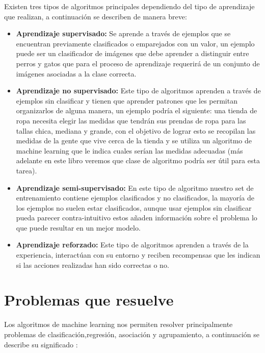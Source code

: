 \documentclass[11pt,fleqn]{book} %
\begin{document}
Existen tres tipos de algoritmos principales dependiendo del tipo de aprendizaje que realizan, a continuación se describen de manera breve:
\begin{itemize}
\item \textbf{Aprendizaje supervisado:} Se aprende a través de ejemplos que se encuentran previamente clasificados o emparejados con un valor, un ejemplo puede ser un clasificador de imágenes que debe aprender a distinguir entre perros y gatos que para el proceso de aprendizaje requerirá de un conjunto de imágenes asociadas a la clase correcta.
\item \textbf{Aprendizaje no supervisado:} Este tipo de algoritmos aprenden a través de ejemplos sin clasificar y tienen que aprender patrones que les permitan organizarlos de alguna manera, un ejemplo podría el siguiente: una tienda de ropa necesita elegir las medidas que tendrán sus prendas de ropa para las tallas chica, mediana y grande, con el objetivo de lograr esto se recopilan las medidas de la gente que vive cerca de la tienda y se utiliza un algoritmo de machine learning que le indica cuales serían las medidas adecuadas (más adelante en este libro veremos que clase de algoritmo podría ser útil para esta tarea).
\item \textbf{Aprendizaje semi-supervisado:} En este tipo de algoritmo nuestro set de entrenamiento contiene ejemplos clasificados y no clasificados, la mayoría de los ejemplos no suelen estar clasificados, aunque usar ejemplos sin clasificar pueda parecer contra-intuitivo estos añaden información sobre el problema lo que puede resultar en un mejor modelo.
\item \textbf{Aprendizaje reforzado:} Este tipo de algoritmos aprenden a través de la experiencia, interactúan con su entorno y reciben recompensas que les indican si las acciones realizadas han sido correctas o no.
\end{itemize}

\section{Problemas que resuelve} 

Los algoritmos de machine learning nos permiten resolver principalmente problemas de clasificación,regresión, asociación y agrupamiento, a continuación se describe su significado \cite{burkov2019hundred}:
\end{document}
